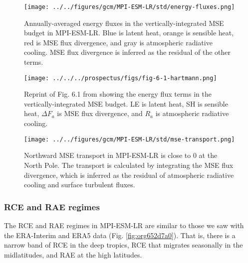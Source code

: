 \documentclass[11pt]{article}
\begin{document}
\begin{figure}[htbp]
\centering
\texttt{[image: ../../figures/gcm/MPI-ESM-LR/std/energy-fluxes.png]}
\caption{\label{fig:org7a8841e}Annually-averaged energy fluxes in the vertically-integrated MSE budget in MPI-ESM-LR. Blue is latent heat, orange is sensible heat, red is MSE flux divergence, and gray is atmospheric radiative cooling. MSE flux divergence is inferred as the residual of the other terms.}
\end{figure}

\begin{figure}[htbp]
\centering
\texttt{[image: ../../../prospectus/figs/fig-6-1-hartmann.png]}
\caption{\label{fig:org5d1a2c0}Reprint of Fig. 6.1 from \cite{hartmann_global_2016} showing the energy flux terms in the vertically-integrated MSE budget. LE is latent heat, SH is sensible heat, \(\Delta F_a\) is MSE flux divergence, and \(R_a\) is atmospheric radiative cooling.}
\end{figure}

\begin{figure}[htbp]
\centering
\texttt{[image: ../../figures/gcm/MPI-ESM-LR/std/mse-transport.png]}
\caption{\label{fig:org343fee3}Northward MSE transport in MPI-ESM-LR is close to 0 at the North Pole. The transport is calculated by integrating the MSE flux divergence, which is inferred as the residual of atmospheric radiative cooling and surface turbulent fluxes.}
\end{figure}

\subsubsection{RCE and RAE regimes}
\label{sec:org7f5e928}
The RCE and RAE regimes in MPI-ESM-LR are similar to those we saw with the ERA-Interim and ERA5 data (Fig. \ref{fig:org652d7a0}). That is, there is a narrow band of RCE in the deep tropics, RCE that migrates seasonally in the midlatitudes, and RAE at the high latitudes.
\end{document}
